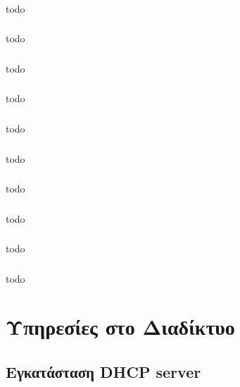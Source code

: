 \documentclass[a4paper, 12pt]{article}
\begin{document}
		\subsubsection{}
			todo

		\subsubsection{}
			todo

		\subsubsection{}
			todo

		\subsubsection{}
			todo

		\subsubsection{}
			todo

		\subsubsection{}
			todo

		\subsubsection{}
			todo

		\subsubsection{}
			todo

		\subsubsection{}
			todo

		\subsubsection{}
			todo

\section{Υπηρεσίες στο Διαδίκτυο}

	\subsection{Εγκατάσταση DHCP server}
\end{document}
